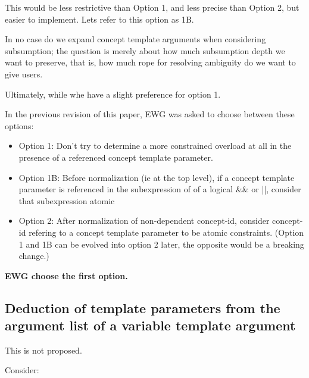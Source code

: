 \documentclass{wg21}
\begin{document}
This would be less restrictive than Option 1, and less precise than Option 2, but easier to implement.
Lets refer to this option as 1B.

In no case do we expand concept template arguments when considering subsumption; the question is merely about how much subsumption depth we want to preserve, that is, how much rope for resolving ambiguity do we want to give users.

Ultimately, while whe have a slight preference for option 1.

In the previous revision of this paper, EWG was asked to choose between these options:

\begin{itemize}
\item Option  1: Don't try to determine a more constrained overload at all in the presence of a referenced concept template parameter.
\item Option 1B: Before normalization (ie at the top level), if a concept template parameter is referenced in the subexpression of of a logical \&\& or ||, consider that subexpression atomic
\item Option 2:  After normalization of non-dependent concept-id, consider concept-id refering to a concept template parameter to be atomic constraints.
(Option 1 and 1B can be evolved into option 2 later, the opposite would be a breaking change.)
\end{itemize}

\textbf{EWG choose the first option.}


\subsection{Deduction of template parameters from the argument list of a variable template argument}

This is not proposed.

Consider:

\end{document}
